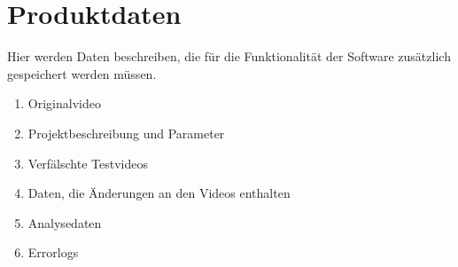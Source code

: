 

\chapter{Produktdaten}
	Hier werden Daten beschreiben,  die für die Funktionalität der Software zusätzlich gespeichert werden müssen.
		\begin{enumerate}
			\item Originalvideo
			\item Projektbeschreibung und Parameter
			\item Verfälschte Testvideos
			\item Daten, die Änderungen an den Videos enthalten
			\item Analysedaten
			\item Errorlogs
		\end{enumerate}


